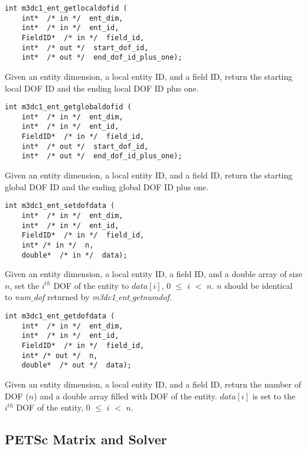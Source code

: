 \begin{verbatim}
int m3dc1_ent_getlocaldofid (
    int*  /* in */  ent_dim, 
    int*  /* in */  ent_id, 
    FieldID*  /* in */  field_id, 
    int*  /* out */  start_dof_id, 
    int*  /* out */  end_dof_id_plus_one);
\end{verbatim}\vspace{-.5cm}\hspace{1cm}
Given an entity dimension, a local entity ID, and a field ID, return the starting local DOF ID and the ending local DOF ID plus one. 

\begin{verbatim}
int m3dc1_ent_getglobaldofid (
    int*  /* in */  ent_dim, 
    int*  /* in */  ent_id, 
    FieldID*  /* in */  field_id, 
    int*  /* out */  start_dof_id, 
    int*  /* out */  end_dof_id_plus_one);
\end{verbatim}\vspace{-.5cm}\hspace{1cm}
Given an entity dimension, a local entity ID, and a field ID, return the starting global DOF ID and the ending global DOF ID plus one. 

\begin{verbatim}
int m3dc1_ent_setdofdata (
    int*  /* in */  ent_dim, 
    int*  /* in */  ent_id, 
    FieldID*  /* in */  field_id,
    int* /* in */  n, 
    double*  /* in */  data);
\end{verbatim}\vspace{-.5cm}\hspace{1cm}
Given an entity dimension, a local entity ID, a field ID, and a double array of size $n$, set the $i^{th}$ DOF of the entity to $data[i]$, $0$ $\le$ $i$ $<$ $n$. $n$ should be identical to \textit{num$\_$dof} returned by \textit{m3dc1$\_$ent$\_$getnumdof}.

\begin{verbatim}
int m3dc1_ent_getdofdata (
    int*  /* in */  ent_dim, 
    int*  /* in */  ent_id, 
    FieldID*  /* in */  field_id,
    int* /* out */  n, 
    double*  /* out */  data);
\end{verbatim}\vspace{-.5cm}\hspace{1cm}
Given an entity dimension, a local entity ID, and a field ID, return the number of DOF ($n$) and a double array filled with DOF of the entity. $data[i]$ is set to the $i^{th}$ DOF of the entity, $0$ $\le$ $i$ $<$ $n$. 

\subsection{PETSc Matrix and Solver}


